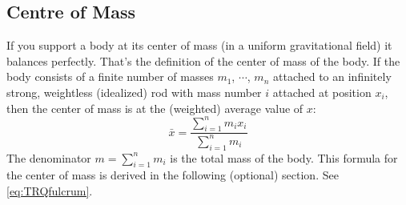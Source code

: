 \subsection{Centre of Mass}
If you support a body at its center of mass (in a uniform gravitational
field) it balances perfectly. That's the definition of the center of mass
of the body.%
If the body consists of a finite number of masses $m_1$, $\cdots$, $m_n$
attached to an infinitely strong, weightless (idealized) rod with mass
number $i$ attached at position $x_i$, then the center of mass is
at the (weighted) average value of $x$:
\begin{equation}\label{eq:weightedrod}
\bar x =\frac{\sum_{i=1}^n m_ix_i}{\sum_{i=1}^n m_i}
\end{equation}
The denominator $m=\sum_{i=1}^n m_i$ is the total mass of the body.
This formula for the
center of mass is derived in the following (optional) section. See
\eqref{eq:TRQfulcrum}.


